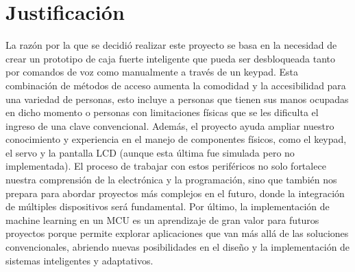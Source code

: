 \section{Justificación}
La razón por la que se decidió realizar este proyecto se basa en la necesidad de crear un prototipo de caja fuerte inteligente que pueda ser desbloqueada tanto por comandos de voz como manualmente a través de un keypad. Esta combinación de métodos de acceso aumenta la comodidad y la accesibilidad para una variedad de personas, esto incluye a personas que tienen sus manos ocupadas en dicho momento o personas con limitaciones físicas que se les dificulta el ingreso de una clave convencional.
Además, el proyecto ayuda ampliar nuestro conocimiento y experiencia en el manejo de componentes físicos, como el keypad, el servo y la pantalla LCD (aunque esta última fue simulada pero no implementada). El proceso de trabajar con estos periféricos no solo fortalece nuestra comprensión de la electrónica y la programación, sino que también nos prepara para abordar proyectos más complejos en el futuro, donde la integración de múltiples dispositivos será fundamental.
Por último, la implementación de machine learning en un MCU es un aprendizaje de gran valor para futuros proyectos porque permite explorar aplicaciones que van más allá de las soluciones convencionales, abriendo nuevas posibilidades en el diseño y la implementación de sistemas inteligentes y adaptativos. 